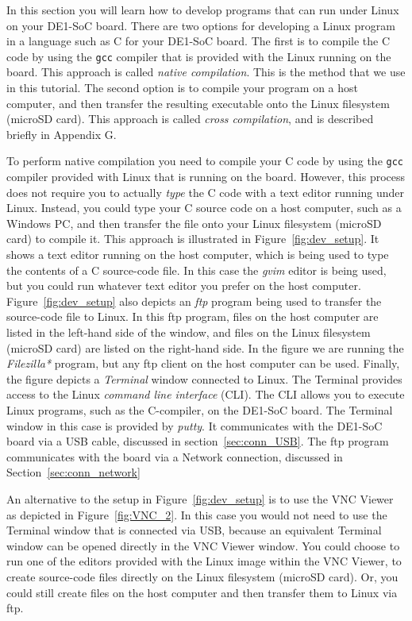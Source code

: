 \documentclass[11pt, twoside, pdftex]{article}
\begin{document}
In this section you will learn how to develop programs that can run under Linux on 
your DE1-SoC board. There are two options for developing a Linux program in a language such
as C for your DE1-SoC board. The first is to compile the C code by using the \texttt{gcc}
compiler that is provided with the Linux running on the board. This approach is called 
\textit{native compilation}. This is the method that we use in this tutorial. The second option is 
to compile your program on a host computer, and then transfer the resulting executable onto 
the Linux filesystem (microSD card). This approach is called \textit{cross compilation}, and 
is described briefly in Appendix G.

To perform native compilation you need to compile your C code by using the \texttt{gcc} compiler 
provided with Linux that is running on the board. However, this process does not require you to
actually {\it type} the C code with a text editor running under Linux. Instead, you could type
your C source code on a host computer, such as a Windows PC, and then transfer the file
onto your Linux filesystem (microSD card) to compile it. This approach is illustrated in 
Figure~\ref{fig:dev_setup}. It shows a text editor running on the host computer, which is being
used to type the contents of a C source-code file. In this case the {\it gvim} editor is
being used, but you could run whatever text editor you prefer on the host computer. 
Figure~\ref{fig:dev_setup} also depicts an {\it ftp} program being used to transfer the
source-code file to Linux. In this ftp program, files on the host computer are listed in the 
left-hand side of the window, and files on the Linux filesystem (microSD card) are listed on
the right-hand side. In the figure we are running the {\it Filezilla*} program, but any 
ftp client on the host computer can be used. Finally, the figure depicts a {\it Terminal} 
window connected to Linux. The Terminal provides access to the Linux 
{\it command line interface} (CLI). The CLI allows you to execute Linux programs, such 
as the C-compiler, on the DE1-SoC board. The Terminal window in this case is provided 
by {\it putty}. It communicates with the DE1-SoC board via a USB cable, discussed in 
section~\ref{sec:conn_USB}. The ftp program communicates with the board
via a Network connection, discussed in Section~\ref{sec:conn_network}

An alternative to the setup in Figure~\ref{fig:dev_setup} is to use the VNC Viewer as
depicted in Figure~\ref{fig:VNC_2}. In this case you would not need to use the Terminal
window that is connected via USB, because an equivalent Terminal window can be opened directly
in the VNC Viewer window. You could choose to run one of the editors provided with the
Linux image within the VNC Viewer, to create source-code files directly on the Linux 
filesystem (microSD card). Or, you could still create files on the host computer and then
transfer them to Linux via ftp.
\end{document}
